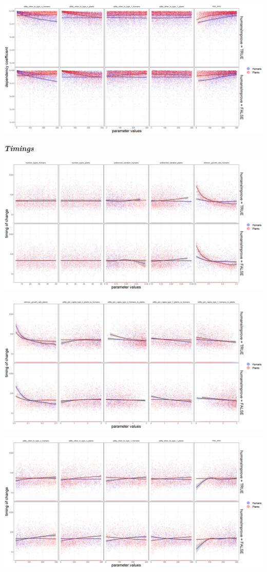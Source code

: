 \documentclass[
]{book}
\begin{document}
\includegraphics[width=1\linewidth]{plots/5_LHS_humansImprove_dependency_coefficients_bifurcationPlot_twoVariables_per_parameter_and_scenario_part3}

\textbf{\emph{Timings}}

\includegraphics[width=1\linewidth]{plots/5_LHS_humansImprove_timing_bifurcationPlot_twoVariables_per_parameter_and_scenario_part1}

\includegraphics[width=1\linewidth]{plots/5_LHS_humansImprove_timing_bifurcationPlot_twoVariables_per_parameter_and_scenario_part2}

\includegraphics[width=1\linewidth]{plots/5_LHS_humansImprove_timing_bifurcationPlot_twoVariables_per_parameter_and_scenario_part3}
\end{document}
